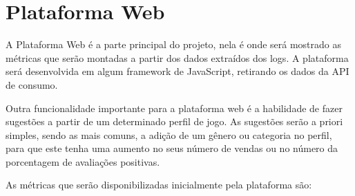 \section{Plataforma Web}
A Plataforma Web é a parte principal do projeto, nela é onde será mostrado as métricas que serão montadas a partir dos dados extraídos dos logs. A plataforma será desenvolvida em algum framework de JavaScript, retirando os dados da API de consumo.

Outra funcionalidade importante para a plataforma web é a habilidade de fazer sugestões a partir de um determinado perfil de jogo. As sugestões serão a priori simples, sendo as mais comuns, a adição de um gênero ou categoria no perfil, para que este tenha uma aumento no seus número de vendas ou no número da porcentagem de avaliações positivas.

As métricas que serão disponibilizadas inicialmente pela plataforma são:
